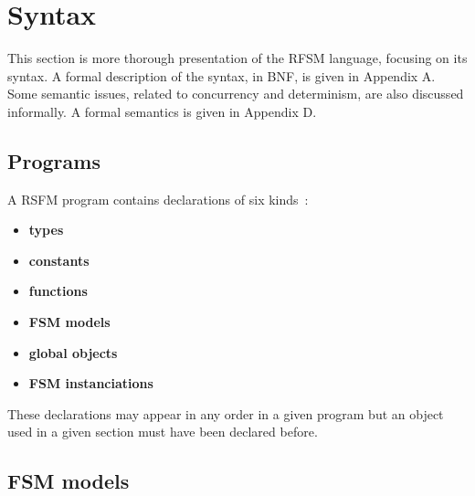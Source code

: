 \chapter{Syntax}
\label{cha:syntax}

This section is more thorough presentation of the RFSM language, focusing on its syntax.
A formal description of the syntax, in BNF, is given in Appendix A.
Some semantic issues, related to concurrency and determinism, are also discussed informally. A
formal semantics is given in Appendix D.

\section{Programs}
\label{sec:programs}

A RSFM program contains declarations of six kinds~: 
\begin{itemize}
\item \textbf{types}
\item \textbf{constants}
\item \textbf{functions}
\item \textbf{FSM models}
\item \textbf{global objects}
\item \textbf{FSM instanciations}
\end{itemize}

These declarations may appear in any order in a given program but an object used in a given section must
have been declared before. 

\section{FSM models}
\label{sec:fsm-models}


